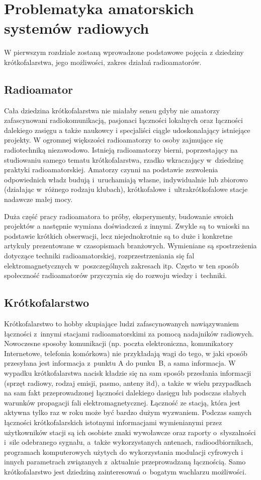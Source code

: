 \documentclass[]{mgr}
\begin{document}
    \chapter{Problematyka amatorskich systemów radiowych}
    \label{sec:teoretical_description}
    W pierwszym rozdziale zostaną wprowadzone podstawowe pojęcia z dziedziny krótkofalarstwa, jego możliwości, zakres działań radioamatorów.

        \section{Radioamator}
        Cała dziedzina krótkofalarstwa nie miałaby sensu gdyby nie amatorzy zafascynowani radiokomunikacją, pasjonaci łączności lokalnych oraz łączności dalekiego zasięgu a także naukowcy i specjaliści ciągle udoskonalający istniejące projekty. W ogromnej większości radioamatorzy to osoby zajmujące się radiotechniką niezawodowo. Istnieją radioamatorzy bierni, poprzestający na studiowaniu samego tematu krótkofalarstwa, rzadko wkraczający w~dziedzinę praktyki radioamatorskiej. Amatorzy czynni na podstawie zezwolenia odpowiednich władz budują i~uruchamiają własne, indywidualnie lub zbiorowo (działając w~różnego rodzaju klubach), krótkofalowe i~ultrakrótkofalowe stacje nadawcze małej mocy.

        Duża część pracy radioamatora to próby, eksperymenty, budowanie swoich projektów a następnie wymiana doświadczeń z innymi. Zwykle są to wnioski na podstawie krótkich obserwacji, lecz niejednokrotnie są to duże i konkretne artykuły prezentowane w czasopismach branżowych. Wymieniane są spostrzeżenia dotyczące techniki radioamatorskiej, rozprzestrzeniania się fal elektromagnetycznych w~poszczególnych zakresach itp. Często w ten sposób społeczność radioamatorów przyczynia się do rozwoju wiedzy i~techniki. 

        \section{Krótkofalarstwo}
        Krótkofalarstwo to hobby skupiające ludzi zafascynowanych nawiązywaniem łączności z~innymi stacjami radioamatorskimi za pomocą nadajników radiowych. Nowoczesne sposoby komunikacji (np. poczta elektroniczna, komunikatory Internetowe, telefonia komórkowa) nie przykładają wagi do tego, w jaki sposób przesyłana jest informacja z~punktu A do punku~B, a sama informacja. W wypadku krótkofalarstwa nacisk kładzie się na sam sposób przesłania informacji (sprzęt radiowy, rodzaj emisji, pasmo, anteny itd), a także w wielu przypadkach na sam fakt przeprowadzonej łączności dalekiego dasięgu lub podsczas słabych warunków propagacji fali elektromagnetycznej. Łączność ze stacją, która jest aktywna tylko raz w roku może być bardzo dużym wyzwaniem. Podczas samych łączności krótkofalarskich istotnymi informacjami wymienianymi przez użytkowników stacji są ich osobiste znaki wywoławcze oraz raporty o~słyszalności i~sile odebranego sygnału, a~także wykorzystanych antenach, radioodbiornikach, programach komputerowych użytych do wykorzystania modulacji cyfrowych i innych parametrach związanych z~aktualnie przeprowadzaną łącznością. Samo krótkofalarstwo jest dziedziną zainteresowań o~bogatym wachlarzu możliwości.
\end{document}
